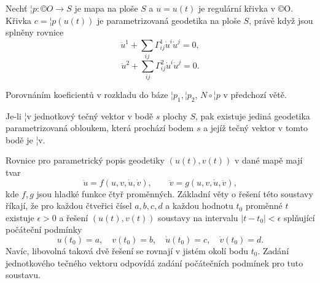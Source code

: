 \documentclass[12pt]{article}                   %
\begin{document}
        \begin{veta}
            Nechť $¦p: ©O \rightarrow S$ je mapa na ploše $S$ a $u = u(t)$ je regulární křivka v ©O. Křivka $c = ¦p(u(t))$ je parametrizovaná geodetika na ploše $S$, právě když jsou splněny rovnice
            $$ \ddot{u}^1 + \sum_{ij}\Gamma_{ij}^1 \dot{u}^i\dot{u}^j = 0, $$
            $$ \ddot{u}^2 + \sum_{ij}\Gamma_{ij}^2 \dot{u}^i\dot{u}^j = 0. $$
            
            \begin{dukazin}
                Porovnáním koeficientů v rozkladu do báze $¦p_1, ¦p_2$, $N \circ ¦p$ v předchozí větě.
            \end{dukazin}
        \end{veta}

        \begin{veta}
            Je-li ¦v jednotkový tečný vektor v bodě $s$ plochy $S$, pak existuje jediná geodetika parametrizovaná obloukem, která prochází bodem $s$ a jejíž tečný vektor v tomto bodě je ¦v.

            \begin{dukazin}
                Rovnice pro parametrický popis geodetiky $(u(t), v(t))$ v dané mapě mají tvar
                $$ \ddot{u} = f(u, v, \dot{u}, \dot{v}), \qquad \ddot{v} = g(u, v, \dot{u}, \ddot{v}), $$
                kde $f, g$ jsou hladké funkce čtyř proměnných. Základní věty o řešení této soustavy říkají, že pro každou čtveřici čísel $a, b, c, d$ a každou hodnotu $t_0$ proměnné $t$ existuje $\epsilon > 0$ a řešení $(u(t), v(t))$ soustavy na intervalu $|t - t_0| < \epsilon$ splňující počáteční podmínky
                $$ u(t_0) = a, \quad v(t_0) = b, \quad \dot{u}(t_0) = c, \quad \dot{v}(t_0) = d. $$
                Navíc, libovolná taková dvě řešení se rovnají v jistém okolí bodu $t_0$. Zadání jednotkového tečného vektoru odpovídá zadání počátečních podmínek pro tuto soustavu.
            \end{dukazin}
        \end{veta}
\end{document}

